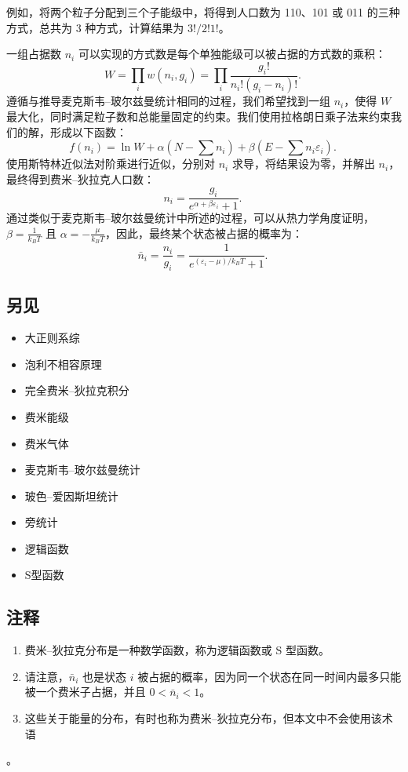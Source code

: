 例如，将两个粒子分配到三个子能级中，将得到人口数为 110、101 或 011 的三种方式，总共为 3 种方式，计算结果为 \(3!/2!1!\)。

一组占据数 \( n_i \) 可以实现的方式数是每个单独能级可以被占据的方式数的乘积：
\[
W = \prod_i w(n_i, g_i) = \prod_i \frac{g_i!}{n_i!(g_i - n_i)!}.~
\]
遵循与推导麦克斯韦–玻尔兹曼统计相同的过程，我们希望找到一组 \( n_i \)，使得 \( W \) 最大化，同时满足粒子数和总能量固定的约束。我们使用拉格朗日乘子法来约束我们的解，形成以下函数：
\[
f(n_i) = \ln W + \alpha (N - \sum n_i) + \beta (E - \sum n_i \varepsilon_i).~
\]
使用斯特林近似法对阶乘进行近似，分别对 \( n_i \) 求导，将结果设为零，并解出 \( n_i \)，最终得到费米–狄拉克人口数：
\[
n_i = \frac{g_i}{e^{\alpha + \beta \varepsilon_i} + 1}.~
\]
通过类似于麦克斯韦–玻尔兹曼统计中所述的过程，可以从热力学角度证明，\( \beta = \frac{1}{k_B T} \) 且 \( \alpha = -\frac{\mu}{k_B T} \)，因此，最终某个状态被占据的概率为：
\[
\bar{n}_i = \frac{n_i}{g_i} = \frac{1}{e^{(\varepsilon_i - \mu)/k_B T} + 1}.~
\]
\subsection{另见}
\begin{itemize}
\item 大正则系综  
\item 泡利不相容原理  
\item 完全费米–狄拉克积分  
\item 费米能级  
\item 费米气体  
\item 麦克斯韦–玻尔兹曼统计  
\item 玻色–爱因斯坦统计  
\item 旁统计  
\item 逻辑函数  
\item S型函数
\end{itemize}
\subsection{注释}  
\begin{enumerate}
\item 费米–狄拉克分布是一种数学函数，称为逻辑函数或 S 型函数。  
\item 请注意，\( \bar{n}_i \) 也是状态 \( i \) 被占据的概率，因为同一个状态在同一时间内最多只能被一个费米子占据，并且 \( 0 < \bar{n}_i < 1 \)。  
\item 这些关于能量的分布，有时也称为费米–狄拉克分布，但本文中不会使用该术语
\end{enumerate}。
